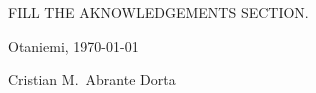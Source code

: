 \documentclass[english, 12pt, a4paper, sci, utf8, a-1b, online]{aaltothesis}
\date{\today}
\begin{document}
\makecoverpage

\makecopyrightpage


\begin{abstractpage}[english]
  \abstracttext{
  }
\end{abstractpage}


\newpage


FILL THE AKNOWLEDGEMENTS SECTION.

\vspace{5cm}
Otaniemi, \today

\vspace{5mm}
{\hfill Cristian M.\ Abrante Dorta \hspace{1cm}}

\newpage


\thesistableofcontents


\end{document}
